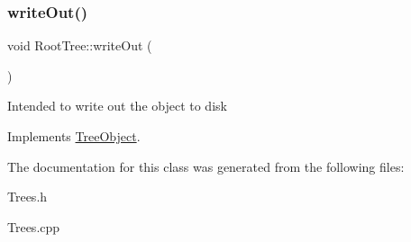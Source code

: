 \subsubsection{\texorpdfstring{write\+Out()}{writeOut()}}
{\footnotesize\ttfamily void Root\+Tree\+::write\+Out (\begin{DoxyParamCaption}{ }\end{DoxyParamCaption})\hspace{0.3cm}{\ttfamily [virtual]}}

Intended to write out the object to disk 

Implements \mbox{\hyperlink{classTreeObject_abf2bf88337bec961784b5dfeb9b795ed}{Tree\+Object}}.



The documentation for this class was generated from the following files\+:\begin{DoxyCompactItemize}
\item 
Trees.\+h\item 
Trees.\+cpp\end{DoxyCompactItemize}
